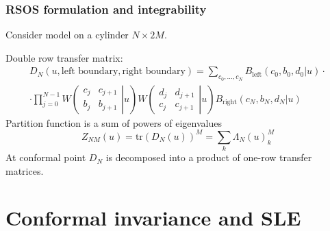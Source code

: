 \documentclass[pdftex]{beamer}
\theoremstyle{definition} \newtheorem{Def}{Definition}
\begin{document}
\begin{frame}
  \frametitle{RSOS formulation and integrability}
  Consider model on a cylinder $N\times 2M$. 

  Double row transfer matrix:
  \begin{multline}
    \label{eq:5}
    D_N(u,\mbox{left boundary},\mbox{right boundary})=\sum_{c_0,\dots,c_N} B_{\mathrm{left}}(c_0,b_0,d_0| u)\cdot\\
    \cdot\prod_{j=0}^{N-1} W \left(\left.\begin{array}{cc} c_j & c_{j+1} \\ b_j & b_{j+1} \end{array}\right| u\right) 
    W \left(\left.\begin{array}{cc} d_j & d_{j+1} \\ c_j & c_{j+1} \end{array}\right| u\right) B_{\mathrm{right}} (c_N, b_N, d_N|u)
  \end{multline}
  Partition function is a sum of powers of eigenvalues
  \begin{equation}
    \label{eq:9}
    Z_{NM}(u)=\mathrm{tr} (D_N(u))^M=\sum_k \Lambda_N(u)_k ^M
  \end{equation}
  At conformal point $D_N$ is decomposed into a product of one-row transfer matrices. 
\end{frame}

\section{Conformal invariance and SLE}
\end{document}
